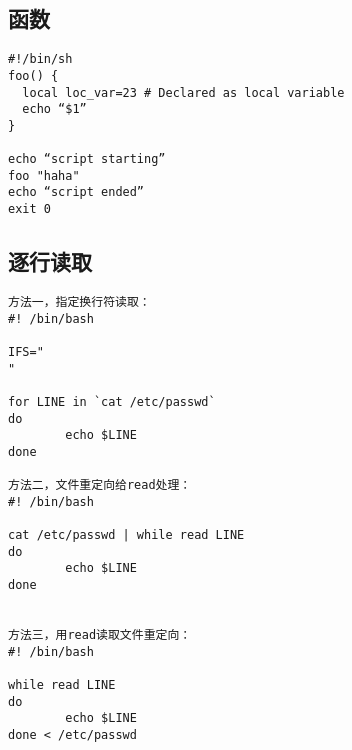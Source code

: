 \begin{verbatim}

\end{verbatim}


\subsection{函数}
\begin{verbatim}
#!/bin/sh
foo() {
  local loc_var=23 # Declared as local variable
  echo “$1”
}

echo “script starting”
foo "haha"
echo “script ended”
exit 0
\end{verbatim}


\subsection{逐行读取}
\begin{verbatim}
方法一，指定换行符读取：
#! /bin/bash  
  
IFS="  
"  
  
for LINE in `cat /etc/passwd`  
do   
        echo $LINE 
done
 
方法二，文件重定向给read处理：
#! /bin/bash  
  
cat /etc/passwd | while read LINE  
do
        echo $LINE 
done
 
 
方法三，用read读取文件重定向：
#! /bin/bash  
  
while read LINE
do
        echo $LINE 
done < /etc/passwd
\end{verbatim}








